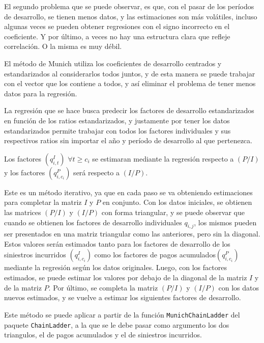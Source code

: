 \documentclass[
  12pt,
]{article}
\begin{document}
El segundo problema que se puede observar, es que, con el pasar de los
períodos de desarrollo, se tienen menos datos, y las estimaciones son
más volátiles, incluso algunas veces se pueden obtener regresiones con
el signo incorrecto en el coeficiente. Y por último, a veces no hay una
estructura clara que refleje correlación. O la misma es muy débil.

El método de Munich utiliza los coeficientes de desarrollo centrados y
estandarizados al considerarlos todos juntos, y de esta manera se puede
trabajar con el vector que los contiene a todos, y así eliminar el
problema de tener menos datos para la regresión.

La regresión que se hace busca predecir los factores de desarrollo
estandarizados en función de los ratios estandarizados, y justamente por
tener los datos estandarizados permite trabajar con todos los factores
individuales y sus respectivos ratios sin importar el año y período de
desarrollo al que pertenezca.

Los factores \((q_{i,t}^I)\) \(\forall t\geq c_i\) se estimaran mediante
la regresión respecto a \((P/I)\) y los factores \((q_{i,c_i}^P)\) será
respecto a \((I/P)\).

Este es un método iterativo, ya que en cada paso se va obteniendo
estimaciones para completar la matriz \(I\) y \(P\) en conjunto. Con los
datos iniciales, se obtienen las matrices \((P/I)\) y \((I/P)\) con
forma triangular, y se puede observar que cuando se obtienen los
factores de desarrollo individuales \(q_{i,j}\), los mismos pueden ser
presentados en una matriz triangular como las anteriores, pero sin la
diagonal. Estos valores serán estimados tanto para los factores de
desarrollo de los siniestros incurridos \((q_{i,c_i}^I)\) como los
factores de pagos acumulados\((q_{i,c_i}^P)\) mediante la regresión
según los datos originales. Luego, con los factores estimados, se puede
estimar los valores por debajo de la diagonal de la matriz \(I\) y de la
matriz \(P\). Por último, se completa la matriz \((P/I)\) y \((I/P)\)
con los datos nuevos estimados, y se vuelve a estimar los siguientes
factores de desarrollo.

Este método se puede aplicar a partir de la función
\texttt{MunichChainLadder} del paquete \texttt{ChainLadder}, a la que se
le debe pasar como argumento los dos triangulos, el de pagos acumulados
y el de siniestros incurridos.
\end{document}
